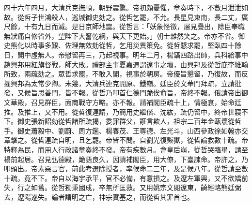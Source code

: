 \begin{pinyinscope}
四十六年四月，大清兵克撫順，朝野震驚。帝初頗憂懼，章奏時下，不數月泄泄如故。從哲子世鴻殺人，巡城御史劾之。從哲乞罷，不允。長星見東南，長二丈，廣尺餘，十有九日而滅。是日京師地震。從哲言：「妖象怪徵，層見疊出，除臣奉職無狀痛自修省外，望陛下大奮乾綱，與天下更始。」朝士雜然笑之。帝亦不省。御史熊化以時事多艱、佐理無效劾從哲，乞用災異策免。從哲懇求罷，堅臥四十餘日，閣中虛無人。帝慰留再三，乃起視事。明年二月，楊鎬四路出師，兵科給事中趙興邦用紅旗督戰，師大敗。禮部主事夏嘉遇謂遼事之壞，由興邦及從哲庇李維翰所致，兩疏劾之。眾哲求罷，不敢入閣，視事於朝房。帝優旨懇留，乃復故，而反擢興邦為太常少卿。未幾，大清兵連克開原、鐵嶺。廷臣於文華門拜疏，立請批發，又候旨思善門，皆不報。從哲乃叩首仁德門跪俟俞旨，帝終不報。俄請帝出御文華殿，召見群臣，面商戰守方略。亦不報。請補閣臣疏十上，情極哀，始命廷推。及推上，又不用。從哲復連請，乃簡用史繼偕、沈紘，疏仍留中，終帝世寢不下。御史張新詔劾從哲諸所疏揭，委罪群父，誑言欺人，祖宗二百年金甌壞從哲手。御史蕭毅中、劉蔚、周方鑑、楊春茂、王尊德、左光斗，山西參政徐如翰亦交章擊之。從哲連疏自明，且乞罷。帝皆不問。自劉光復繫獄，從哲論救數十疏。帝特釋為民，而用人行政諸章奏終不發。帝有疾數月。會皇后崩，從哲哭臨畢，請至榻前起居。召見弘德殿，跪語良久，因請補閣臣，用大僚，下臺諫命。帝許之，乃叩頭出。帝素惡言官，前此考選除授者，率候命二三年，及是候八年。從哲請至數十疏，竟不下。帝自以海宇承平，官不必備，有意損之。及遼左軍興，又不欲矯前失，行之如舊。從哲獨秉國成，卒無所匡救。又用姚宗文閱遼東，齮經略熊廷弼去，遼陽遂失。論者謂明之亡，神宗實基之，而從哲其罪首也。


\end{pinyinscope}
